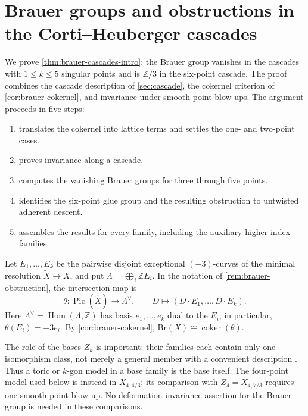 \documentclass[11pt]{article}
\theoremstyle{plain}
\theoremstyle{definition}
\theoremstyle{remark}
\newcommand{\Z}{\mathbb Z}
\newcommand{\Pic}{\operatorname{Pic}}
\newcommand{\Hom}{\operatorname{Hom}}
\newcommand{\Br}{\mathrm{Br}}
\begin{document}
\appendix
\section{Brauer groups and obstructions in the Corti--Heuberger cascades}
\label{app:brauer}

We prove \cref{thm:brauer-cascades-intro}: the Brauer group vanishes in the
cascades with \(1\leq k\leq5\) singular points and is \(\Z/3\) in the
six-point cascade. The proof combines the cascade description of
\cref{sec:cascade}, the cokernel criterion of \cref{cor:brauer-cokernel},
and invariance under smooth-point blow-ups. The argument proceeds in five
steps:
\begin{enumerate}[label=\arabic*.,leftmargin=*,itemsep=2pt]
\item {} translates the cokernel into lattice terms
and settles the one- and two-point cases.
\item {} proves invariance along a cascade.
\item {} computes the vanishing Brauer groups
for three through five points.
\item {} identifies the six-point glue group and the
resulting obstruction to untwisted adherent descent.
\item {} assembles the results for every
family, including the auxiliary higher-index families.
\end{enumerate}

Let \(E_1,\dots,E_k\) be the pairwise disjoint exceptional \((-3)\)-curves
of the minimal resolution \(\widetilde X\to X\), and put
\(\Lambda=\bigoplus_i\Z E_i\). In the notation of
\cref{rem:brauer-obstruction}, the intersection map is
\[
\theta:\Pic(\widetilde X)\longrightarrow\Lambda^\vee,
\qquad
D\longmapsto(D\cdot E_1,\dots,D\cdot E_k).
\]
Here \(\Lambda^\vee=\Hom(\Lambda,\Z)\) has basis \(e_1,\dots,e_k\)
dual to the \(E_i\); in particular, \(\theta(E_i)=-3e_i\).
By \cref{cor:brauer-cokernel}, \(\Br(X)\cong\operatorname{coker}(\theta)\).

The role of the bases \(Z_k\) is important: their families each contain
only one isomorphism class, not merely a general member with a convenient
description \cite[Remark~7]{Corti2016}. Thus a toric or \(k\)-gon model
in a base family is the base itself. The four-point model used below is
instead in \(X_{4,4/3}\); its comparison with \(Z_4=X_{4,7/3}\) requires
one smooth-point blow-up. No deformation-invariance assertion for the
Brauer group is needed in these comparisons.
\end{document}

